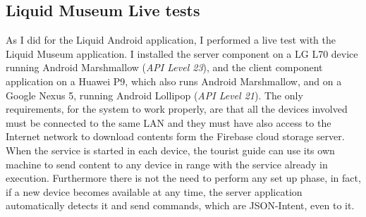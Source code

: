 \subsection{Liquid Museum Live tests}
As I did for the Liquid Android application, I performed a live test with the Liquid Museum application. I installed the server component on a LG L70 device running Android Marshmallow (\textit{API Level 23}), and the client component application on a Huawei P9, which also runs Android Marshmallow, and on a Google Nexus 5, running Android Lollipop (\textit{API Level 21}). The only requirements, for the system to work properly, are that all the devices involved must be connected to the same LAN and they must have also access to the Internet network to download contents form the Firebase cloud storage server. When the service is started in each device, the tourist guide can use its own machine to send content to any device in range with the service already in execution. Furthermore there is not the need to perform any set up phase, in fact, if a new device becomes available at any time, the server application automatically detects it and send commands, which are JSON-Intent, even to it.
